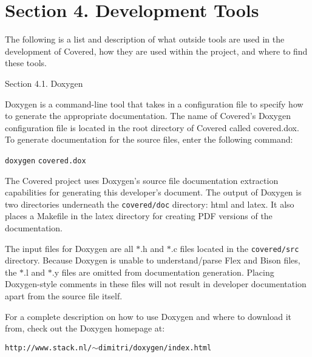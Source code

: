 \section{Section 4.  Development Tools}\label{page_tools}
\begin{Desc}
\item[]The following is a list and description of what outside tools are used in the development of Covered, how they are used within the project, and where to find these tools.\end{Desc}
\begin{Desc}
\item[Section 4.1. Doxygen]\end{Desc}
\begin{Desc}
\item[]Doxygen is a command-line tool that takes in a configuration file to specify how to generate the appropriate documentation. The name of Covered's Doxygen configuration file is located in the root directory of Covered called covered.dox. To generate documentation for the source files, enter the following command:\end{Desc}
\begin{Desc}
\item[]{\tt doxygen} {\tt covered.dox} \end{Desc}
\begin{Desc}
\item[]The Covered project uses Doxygen's source file documentation extraction capabilities for generating this developer's document. The output of Doxygen is two directories underneath the {\tt covered/doc} directory: html and latex. It also places a Makefile in the latex directory for creating PDF versions of the documentation.\end{Desc}
\begin{Desc}
\item[]The input files for Doxygen are all $\ast$.h and $\ast$.c files located in the {\tt covered/src} directory. Because Doxygen is unable to understand/parse Flex and Bison files, the $\ast$.l and $\ast$.y files are omitted from documentation generation. Placing Doxygen-style comments in these files will not result in developer documentation apart from the source file itself.\end{Desc}
\begin{Desc}
\item[]For a complete description on how to use Doxygen and where to download it from, check out the Doxygen homepage at:\end{Desc}
\begin{Desc}
\item[]{\tt http://www.stack.nl/$\sim$dimitri/doxygen/index.html}\end{Desc}




